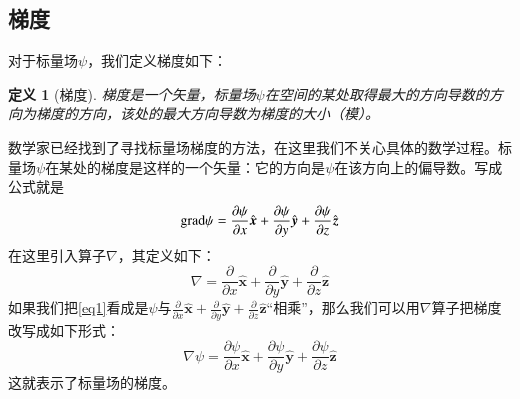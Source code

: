 \documentclass[12pt,a4paper]{ctexart}
\newtheorem{definition}{\indent 定义}[section]
\renewcommand*{\bf}[1]{\boldsymbol{#1}}
\newcommand*{\hatbf}[1]{\hat{\bf{#1}}}
\newcommand*{\grad}{\textbf{\rm{grad}}}
\numberwithin{equation}{section}
\begin{document}
            \subsection{梯度}
            对于标量场$\psi$，我们定义梯度如下：
            \begin{definition}[梯度]
                梯度是一个矢量，标量场$\psi$在空间的某处取得最大的方向导数的方向为梯度的方向，该处的最大方向导数为梯度的大小（模）。
            \end{definition}
            数学家已经找到了寻找标量场梯度的方法，在这里我们不关心具体的数学过程。标量场$\psi$在某处的梯度是这样的一个矢量：它的方向是$\psi$在该方向上的偏导数。写成公式就是
            \begin{equation}
                \grad\psi = \frac{\partial \psi}{\partial x} \hatbf{x} + \frac{\partial \psi}{\partial y} \hatbf{y} + \frac{\partial \psi}{\partial z} \hatbf{z} \label{eq1}
            \end{equation}
            在这里引入算子$\nabla$，其定义如下：
            \begin{equation}
                \nabla = \frac{\partial}{\partial x} \hatbf{x} + \frac{\partial}{\partial y} \hatbf{y} + \frac{\partial}{\partial z} \hatbf{z} \label{eq2}
            \end{equation}
            如果我们把\ref{eq1}看成是$\psi$与$\displaystyle \frac{\partial}{\partial x} \hatbf{x} + \frac{\partial}{\partial y} \hatbf{y} + \frac{\partial}{\partial z} \hatbf{z}$“相乘”，那么我们可以用$\nabla$算子把梯度改写成如下形式：
            \begin{equation}
                \nabla\psi = \frac{\partial\psi}{\partial x} \hatbf{x} + \frac{\partial\psi}{\partial y} \hatbf{y} + \frac{\partial\psi}{\partial z} \hatbf{z} \label{eq3}
            \end{equation}
            这就表示了标量场的梯度。
\end{document}
